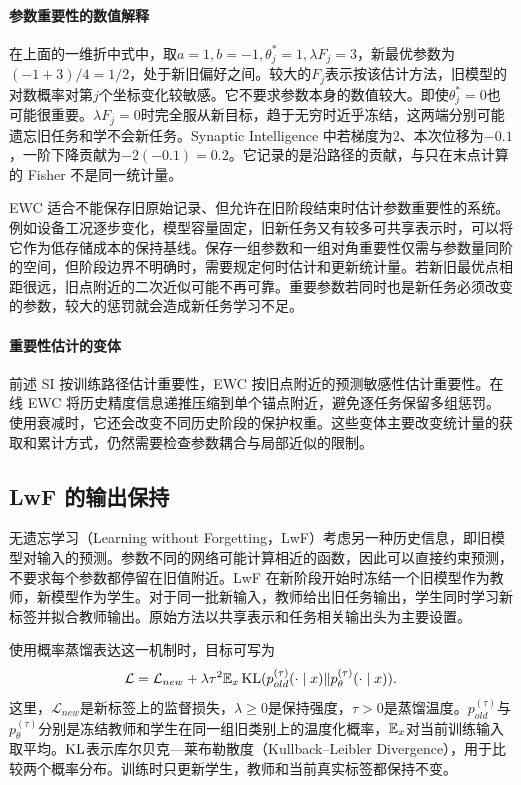 \paragraph{参数重要性的数值解释}
在上面的一维折中式中，取$a=1,b=-1,\theta_j^*=1,\lambda F_j=3$，新最优参数为$(-1+3)/4=1/2$，处于新旧偏好之间。较大的$F_j$表示按该估计方法，旧模型的对数概率对第$j$个坐标变化较敏感。它不要求参数本身的数值较大。即使$\theta_j^*=0$也可能很重要。$\lambda F_j=0$时完全服从新目标，趋于无穷时近乎冻结，这两端分别可能遗忘旧任务和学不会新任务。Synaptic Intelligence 中若梯度为$2$、本次位移为$-0.1$，一阶下降贡献为$-2(-0.1)=0.2$。它记录的是沿路径的贡献，与只在末点计算的 Fisher 不是同一统计量。

EWC 适合不能保存旧原始记录、但允许在旧阶段结束时估计参数重要性的系统。例如设备工况逐步变化，模型容量固定，旧新任务又有较多可共享表示时，可以将它作为低存储成本的保持基线。保存一组参数和一组对角重要性仅需与参数量同阶的空间，但阶段边界不明确时，需要规定何时估计和更新统计量。若新旧最优点相距很远，旧点附近的二次近似可能不再可靠。重要参数若同时也是新任务必须改变的参数，较大的惩罚就会造成新任务学习不足。

\paragraph{重要性估计的变体}
前述 SI 按训练路径估计重要性，EWC 按旧点附近的预测敏感性估计重要性。在线 EWC 将历史精度信息递推压缩到单个锚点附近，避免逐任务保留多组惩罚。使用衰减时，它还会改变不同历史阶段的保护权重。这些变体主要改变统计量的获取和累计方式，仍然需要检查参数耦合与局部近似的限制。

\subsection{LwF 的输出保持}
无遗忘学习（Learning without Forgetting，LwF）考虑另一种历史信息，即旧模型对输入的预测\cite{li2017lwf}。参数不同的网络可能计算相近的函数，因此可以直接约束预测，不要求每个参数都停留在旧值附近。LwF 在新阶段开始时冻结一个旧模型作为教师，新模型作为学生。对于同一批新输入，教师给出旧任务输出，学生同时学习新标签并拟合教师输出。原始方法以共享表示和任务相关输出头为主要设置。

使用概率蒸馏表达这一机制时，目标可写为
\begin{equation}
 \mathcal L=\mathcal L_{new}+\lambda\tau^2
 \mathbb{E}_x\operatorname{KL}(p_{old}^{(\tau)}(\cdot\mid x)\|p_\theta^{(\tau)}(\cdot\mid x)).
\end{equation}
这里，$\mathcal L_{new}$是新标签上的监督损失，$\lambda\geq0$是保持强度，$\tau>0$是蒸馏温度。$p_{old}^{(\tau)}$与$p_\theta^{(\tau)}$分别是冻结教师和学生在同一组旧类别上的温度化概率，$\mathbb{E}_x$对当前训练输入取平均。$\operatorname{KL}$表示库尔贝克—莱布勒散度（Kullback--Leibler Divergence），用于比较两个概率分布。训练时只更新学生，教师和当前真实标签都保持不变。

